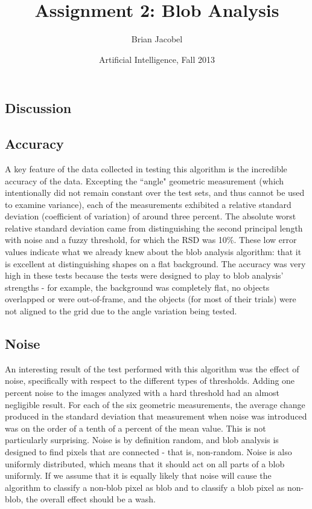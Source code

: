 \documentclass{article}
\title{Assignment 2: Blob Analysis}
\author{Brian Jacobel}
\date{Artificial Intelligence, Fall 2013}
\begin{document}
\maketitle

\begin{doublespace}

\section{Discussion}

\subsection{Accuracy}
A key feature of the data collected in testing this algorithm is the incredible accuracy of the data. Excepting the ``angle" geometric measurement (which intentionally did not remain constant over the test sets, and thus cannot be used to examine variance), each of the measurements exhibited a relative standard deviation (coefficient of variation) of around three percent. The absolute worst relative standard deviation came from distinguishing the second principal length with noise and a fuzzy threshold, for which the RSD was 10\%. These low error values indicate what we already knew about the blob analysis algorithm: that it is excellent at distinguishing shapes on a flat background. The accuracy was very high in these tests because the tests were designed to play to blob analysis' strengths - for example, the background was completely flat, no objects overlapped or were out-of-frame, and the objects (for most of their trials) were not aligned to the grid due to the angle variation being tested. 

 
\subsection{Noise}
An interesting result of the test performed with this algorithm was the effect of noise, specifically with respect to the different types of thresholds. Adding one percent noise to the images analyzed with a hard threshold had an almost negligible result. For each of the six geometric measurements, the average change produced in the standard deviation that measurement when noise was introduced was on the order of a tenth of a percent of the mean value. This is not particularly surprising. Noise is by definition random, and blob analysis is designed to find pixels that are connected - that is, non-random. Noise is also uniformly distributed, which means that it should act on all parts of a blob uniformly. If we assume that it is equally likely that noise will cause the algorithm to classify a non-blob pixel as blob and to classify a blob pixel as non-blob, the overall effect should be a wash.


\end{doublespace}
\end{document}
